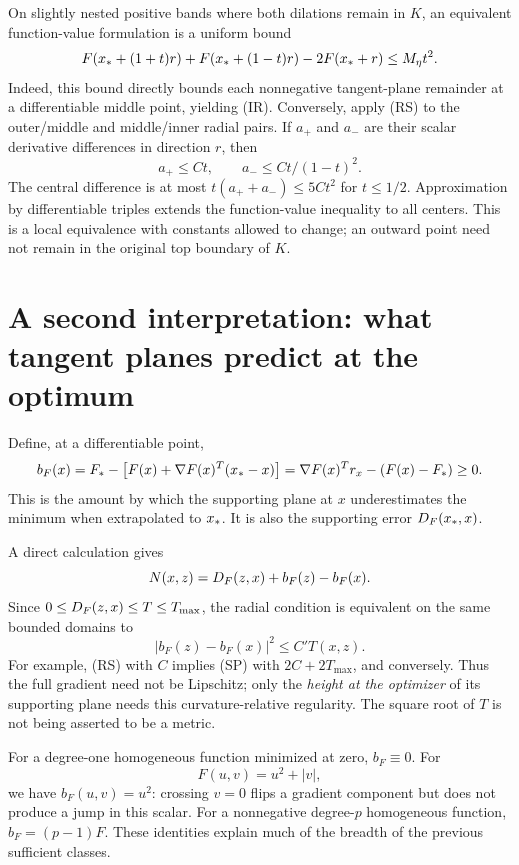 On slightly nested positive bands where both dilations remain in $K$, an equivalent function-value formulation is a uniform bound
\begin{equation}
 F(x_*+(1+t)r)+F(x_*+(1-t)r)-2F(x_*+r)\le M_\eta t^2.
 \label{R:eq:central}
\end{equation}
Indeed, this bound directly bounds each nonnegative tangent-plane remainder at a differentiable middle point, yielding (IR). Conversely, apply (RS) to the outer/middle and middle/inner radial pairs. If $a_+$ and $a_-$ are their scalar derivative differences in direction $r$, then
\[
 a_+\le C t,\qquad a_-\le Ct/(1-t)^2.
\]
The central difference is at most $t(a_++a_-)\le5Ct^2$ for $t\le1/2$. Approximation by differentiable triples extends the function-value inequality to all centers. This is a local equivalence with constants allowed to change; an outward point need not remain in the original top boundary of $K$.


\setcounter{section}{2}
\setcounter{theorem}{0}
\setcounter{equation}{4}
\section{A second interpretation: what tangent planes predict at the optimum}
Define, at a differentiable point,
\[
 b_F(x)=F_*-\bigl[F(x)+\nabla F(x)^T(x_*-x)\bigr]
       =\nabla F(x)^Tr_x-(F(x)-F_*)\ge0.
\]
This is the amount by which the supporting plane at $x$ underestimates the minimum when extrapolated to $x_*$. It is also the supporting error $D_F(x_*,x)$.

A direct calculation gives
\begin{equation}
 N(x,z)=D_F(z,x)+b_F(z)-b_F(x).
 \label{R:eq:intercept}
\end{equation}
Since $0\le D_F(z,x)\le T\le T_{\max}$, the radial condition is equivalent on the same bounded domains to
\begin{equation}
 |b_F(z)-b_F(x)|^2\le C' T(x,z).
 \tag{R.SP}\label{R:eq:SP}
\end{equation}
For example, (RS) with $C$ implies (SP) with $2C+2T_{\max}$, and conversely. Thus the full gradient need not be Lipschitz; only the \emph{height at the optimizer} of its supporting plane needs this curvature-relative regularity. The square root of $T$ is not being asserted to be a metric.

For a degree-one homogeneous function minimized at zero, $b_F\equiv0$. For
\[
 F(u,v)=u^2+|v|,
\]
we have $b_F(u,v)=u^2$: crossing $v=0$ flips a gradient component but does not produce a jump in this scalar. For a nonnegative degree-$p$ homogeneous function, $b_F=(p-1)F$. These identities explain much of the breadth of the previous sufficient classes.

